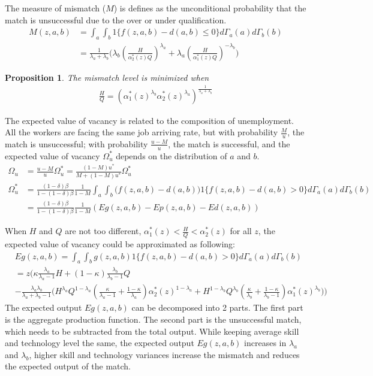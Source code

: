 \documentclass[12pt]{article}
\newtheorem{proposition}{Proposition}
\newcommand{\1}{\mathbb{1}}
\begin{document}
The measure of mismatch ($M$) is defines as the unconditional probability that the match is unsuccessful due to the over or under qualification. 
\begin{align*}
M(z,a,b) &= \int_a\int_b1\{f(z,a,b)-d(a,b) \leq 0\}d\Gamma_a(a)d\Gamma_b(b) \\
&= \frac{1}{\lambda_a+\lambda_b}\Big(\lambda_b(\frac{H}{\alpha_2^*(z)Q})^{\lambda_a}+\lambda_a(\frac{H}{\alpha_1^*(z)Q})^{-\lambda_b}\Big)
\end{align*}
\begin{proposition}
The mismatch level is minimized when 
\begin{align*}
\frac{H}{Q} = (\alpha_1^*(z)^{\lambda_b}\alpha_2^*(z)^{\lambda_a})^{\frac{1}{\lambda_a+\lambda_b}}
\end{align*}
\end{proposition}
The expected value of vacancy is related to the composition of unemployment. All the workers are facing the same job arriving rate, but with probability $\frac{M}{u}$, the match is unsuccessful; with probability $\frac{u-M}{u}$, the match is successful, and the expected value of vacancy $\Omega_u^*$  depends on the distribution of $a$ and $b$. 
\begin{align*}
\Omega_u &= \frac{u-M}{u}\Omega_u^* = \frac{(1-M)u^*}{M + (1-M)u^*}\Omega_u^* \\
\Omega_u^* &= \frac{(1-\delta)\beta}{1-(1-\delta)\beta}\frac{1}{1-M}\int_a\int_b\Big(f(z,a,b)-d(a,b)\Big)1\{f(z,a,b)-d(a,b)>0\}d\Gamma_a(a)d\Gamma_b(b) \\
				&=\frac{(1-\delta)\beta}{1-(1-\delta)\beta} \frac{1}{1-M}  (Eg(z,a,b)-Ep(z,a,b)-Ed(z,a,b))
\end{align*}

When $H$ and $Q$ are not too different, $\alpha_1^*(z)<\frac{H}{Q}<\alpha_2^*(z)$ for all $z$, the expected value of vacancy could be approximated as following: 
\begin{align*}
& Eg(z,a,b)= \int_a\int_bg(z,a,b)1\{f(z,a,b)-d(a,b)>0\}d\Gamma_a(a)d\Gamma_b(b) \\
&= z\Big(\kappa\frac{\lambda_a}{\lambda_a-1}H+(1-\kappa)\frac{\lambda_b}{\lambda_b-1}Q \\
&-\frac{\lambda_a\lambda_b}{\lambda_a+\lambda_b-1}\big(H^{\lambda_a}Q^{1-\lambda_a}(\frac{\kappa}{\lambda_a-1}+\frac{1-\kappa}{\lambda_a})\alpha_2^*(z)^{1-\lambda_a}+H^{1-\lambda_b}Q^{\lambda_b}(\frac{\kappa}{\lambda_b}+\frac{1-\kappa}{\lambda_b-1})\alpha_1^*(z)^{\lambda_b}\big)\Big)
\end{align*}
The expected output $Eg(z,a,b)$ can be decomposed into 2 parts. The first part is the aggregate production function. The second part is the unsuccessful match, which needs to be subtracted from the total output. While keeping average skill and technology level the same, the expected output $Eg(z,a,b)$ increases in $\lambda_a$ and $\lambda_b$, higher skill and technology variances increase the mismatch and reduces the expected output of the match.  \\
\end{document}
